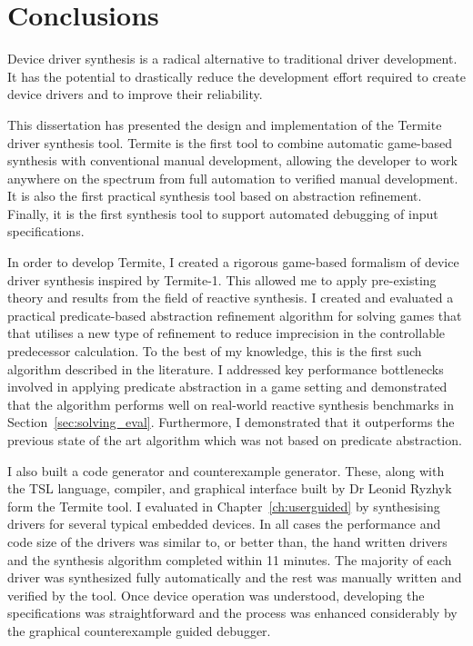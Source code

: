 \chapter{Conclusions}

Device driver synthesis is a radical alternative to traditional driver development. It has the potential to drastically reduce the development effort required to create device drivers and to improve their reliability.

This dissertation has presented the design and implementation of the Termite driver synthesis tool. Termite is the first tool to combine automatic game-based synthesis with conventional manual development, allowing the developer to work anywhere on the spectrum from full automation to verified manual development. It is also the first practical synthesis tool based on abstraction refinement. Finally, it is the first synthesis tool to support automated debugging of input specifications. 

In order to develop Termite, I created a rigorous game-based formalism of device driver synthesis inspired by Termite-1. This allowed me to apply pre-existing theory and results from the field of reactive synthesis. I created and evaluated a practical predicate-based abstraction refinement algorithm for solving games that that utilises a new type of refinement to reduce imprecision in the controllable predecessor calculation. To the best of my knowledge, this is the first such algorithm described in the literature. I addressed key performance bottlenecks involved in applying predicate abstraction in a game setting and demonstrated that the algorithm performs well on real-world reactive synthesis benchmarks in Section~\ref{sec:solving_eval}. Furthermore, I demonstrated that it outperforms the previous state of the art algorithm which was not based on predicate abstraction.

I also built a code generator and counterexample generator. These, along with the TSL language, compiler, and graphical interface built by Dr Leonid Ryzhyk form the Termite tool. I evaluated \termite in Chapter~\ref{ch:userguided} by synthesising drivers for several typical embedded devices. In all cases the performance and code size of the drivers was similar to, or better than, the hand written drivers and the synthesis algorithm completed within 11 minutes. The majority of each driver was synthesized fully automatically and the rest was manually written and verified by the tool. Once device operation was understood, developing the specifications was straightforward and the process was enhanced considerably by the graphical counterexample guided debugger.

